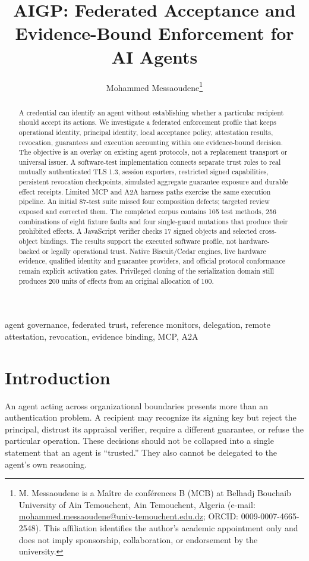 \documentclass[journal,10pt]{IEEEtran}
\title{AIGP: Federated Acceptance and Evidence-Bound Enforcement for AI Agents}
\author{Mohammed Messaoudene\thanks{M. Messaoudene is a Ma\^itre de conf\'erences B (MCB) at Belhadj Bouchaib University of Ain Temouchent, Ain Temouchent, Algeria (e-mail: \url{mohammed.messaoudene@univ-temouchent.edu.dz}; ORCID: \mbox{0009-0007-4665-2548}). This affiliation identifies the author's academic appointment only and does not imply sponsorship, collaboration, or endorsement by the university.}}
\begin{document}
\maketitle
\begin{abstract}
A credential can identify an agent without establishing whether a particular recipient should accept its actions. We investigate a federated enforcement profile that keeps operational identity, principal identity, local acceptance policy, attestation results, revocation, guarantees and execution accounting within one evidence-bound decision. The objective is an overlay on existing agent protocols, not a replacement transport or universal issuer. A software-test implementation connects separate trust roles to real mutually authenticated TLS 1.3, session exporters, restricted signed capabilities, persistent revocation checkpoints, simulated aggregate guarantee exposure and durable effect receipts. Limited MCP and A2A harness paths exercise the same execution pipeline. An initial 87-test suite missed four composition defects; targeted review exposed and corrected them. The completed corpus contains 105 test methods, 256 combinations of eight fixture faults and four single-guard mutations that produce their prohibited effects. A JavaScript verifier checks 17 signed objects and selected cross-object bindings. The results support the executed software profile, not hardware-backed or legally operational trust. Native Biscuit/Cedar engines, live hardware evidence, qualified identity and guarantee providers, and official protocol conformance remain explicit activation gates. Privileged cloning of the serialization domain still produces 200 units of effects from an original allocation of 100.
\end{abstract}
\begin{IEEEkeywords}
agent governance, federated trust, reference monitors, delegation, remote attestation, revocation, evidence binding, MCP, A2A
\end{IEEEkeywords}

\section{Introduction}
An agent acting across organizational boundaries presents more than an authentication problem. A recipient may recognize its signing key but reject the principal, distrust its appraisal verifier, require a different guarantee, or refuse the particular operation. These decisions should not be collapsed into a single statement that an agent is ``trusted.'' They also cannot be delegated to the agent's own reasoning.
\end{document}
